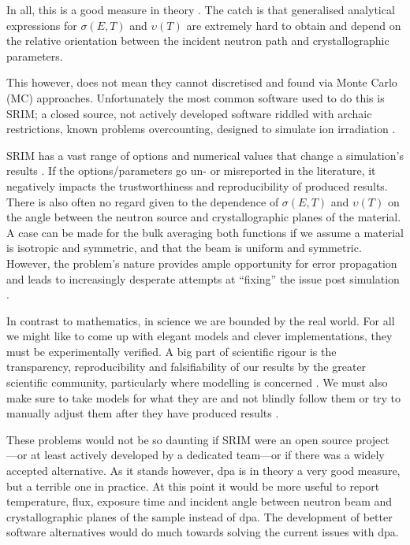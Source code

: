 \documentclass[12pt, a4paper]{article}
\begin{document}
		In all, this is a good measure in theory \cite{dpa}. The catch is that generalised analytical expressions for $\sigma (E,T)$ and $\upsilon (T)$ are extremely hard to obtain and depend on the relative orientation between the incident neutron path and crystallographic parameters.
		
		This however, does not mean they cannot discretised and found via Monte Carlo (MC) approaches. Unfortunately the most common software used to do this is SRIM; a closed source, not actively developed software riddled with archaic restrictions, known problems overcounting, designed to simulate ion irradiation \cite{srim,srimisbad,dpa}.
		
		SRIM has a vast range of options and numerical values that change a simulation's results \cite{srim}. If the options/parameters go un- or misreported in the literature, it negatively impacts the trustworthiness and reproducibility of produced results. There is also often no regard given to the dependence of $\sigma (E,T)$ and $\upsilon (T)$ on the angle between the neutron source and crystallographic planes of the material. A case can be made for the bulk averaging both functions if we assume a material is isotropic and symmetric, and that the beam is uniform and symmetric. However, the problem's nature provides ample opportunity for error propagation and leads to increasingly desperate attempts at ``fixing'' the issue post simulation \cite{srimisbad}.
		
		In contrast to mathematics, in science we are bounded by the real world. For all we might like to come up with elegant models and clever implementations, they must be experimentally verified. A big part of scientific rigour is the transparency, reproducibility and falsifiability of our results by the greater scientific community, particularly where modelling is concerned \cite{transparency}. We must also make sure to take models for what they are and not blindly follow them or try to manually adjust them after they have produced results \cite{error}.
		
		These problems would not be so daunting if SRIM were an open source project \cite{openvsclosed}---or at least actively developed by a dedicated team---or if there was a widely accepted alternative. As it stands however, dpa is in theory a very good measure, but a terrible one in practice. At this point it would be more useful to report temperature, flux, exposure time and incident angle between neutron beam and crystallographic planes of the sample instead of dpa. The development of better software alternatives would do much towards solving the current issues with dpa.
\end{document}
